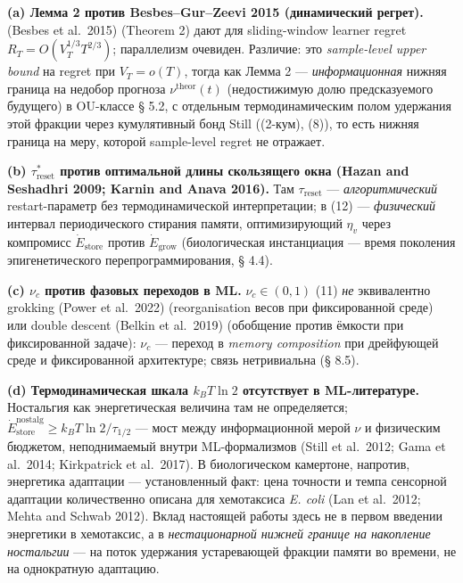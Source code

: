 \documentclass[pdflatex,sn-mathphys-ay]{sn-jnl}
\begin{document}
\textbf{(a) Лемма 2 против Besbes--Gur--Zeevi 2015 (динамический регрет).} (Besbes et al.~2015) (Theorem 2) дают для sliding-window learner regret \(R_T = O(V_T^{1/3} T^{2/3})\); параллелизм очевиден. Различие: это \emph{sample-level upper bound} на regret при \(V_T = o(T)\), тогда как Лемма 2 --- \emph{информационная} нижняя граница на недобор прогноза \(\nu^{\text{theor}}(t)\) (недостижимую долю предсказуемого будущего) в OU-классе § 5.2, с отдельным термодинамическим полом удержания этой фракции через кумулятивный бонд Still ((2-кум), (8)), то есть нижняя граница на меру, которой sample-level regret не отражает.



\textbf{(b) \(\tau_{\text{reset}}^*\) против оптимальной длины скользящего окна (Hazan and Seshadhri 2009; Karnin and Anava 2016).} Там \(\tau_{\text{reset}}\) --- \emph{алгоритмический} restart-параметр без термодинамической интерпретации; в (12) --- \emph{физический} интервал периодического стирания памяти, оптимизирующий \(\eta_v\) через компромисс \(\dot E_{\text{store}}\) против \(\dot E_{\text{grow}}\) (биологическая инстанциация --- время поколения эпигенетического перепрограммирования, § 4.4).



\textbf{(c) \(\nu_c\) против фазовых переходов в ML.} \(\nu_c \in (0,1)\) (11) \emph{не} эквивалентно grokking (Power et al.~2022) (reorganisation весов при фиксированной среде) или double descent (Belkin et al.~2019) (обобщение против ёмкости при фиксированной задаче): \(\nu_c\) --- переход в \emph{memory composition} при дрейфующей среде и фиксированной архитектуре; связь нетривиальна (§ 8.5).



\textbf{(d) Термодинамическая шкала \(k_B T \ln 2\) отсутствует в ML-литературе.} Ностальгия как энергетическая величина там не определяется; \(\dot{E}_{\text{store}}^{\text{nostalg}} \ge k_B T \ln 2 / \tau_{1/2}\) --- мост между информационной мерой \(\nu\) и физическим бюджетом, неподнимаемый внутри ML-формализмов (Still et al.~2012; Gama et al.~2014; Kirkpatrick et al.~2017). В биологическом камертоне, напротив, энергетика адаптации --- установленный факт: цена точности и темпа сенсорной адаптации количественно описана для хемотаксиса \emph{E. coli} (Lan et al.~2012; Mehta and Schwab 2012). Вклад настоящей работы здесь не в первом введении энергетики в хемотаксис, а в \emph{нестационарной нижней границе на накопление ностальгии} --- на поток удержания устаревающей фракции памяти во времени, не на однократную адаптацию.
\end{document}
